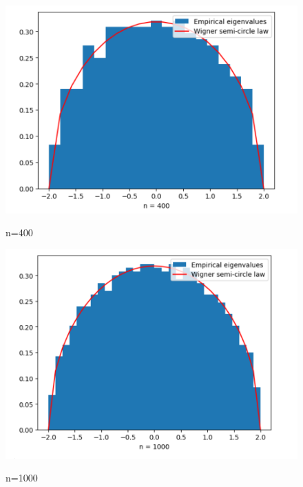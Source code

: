 \documentclass{article}
\begin{document}
\begin{figure}[h]
	\begin{minipage}{0.32\linewidth}
		\vspace{3pt}
		\centerline{\includegraphics[width=\textwidth]{Screenshot 2024-07-20 223652.png}}
		\centerline{n=400}
	\end{minipage}
	\begin{minipage}{0.32\linewidth}
		\vspace{3pt}
		\centerline{\includegraphics[width=\textwidth]{Screenshot 2024-07-20 223801.png}}
		\centerline{n=1000}
	\end{minipage}
	\begin{minipage}{0.32\linewidth}
		\vspace{3pt}

\end{minipage}
\end{figure}
\end{document}
